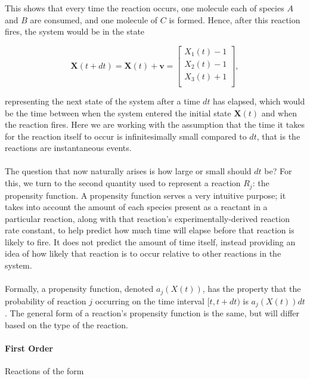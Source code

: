 \documentclass[ugrad,lot,lof,openright,11pt,oneside,onehalfspace]{RUthesis}
\begin{document}
				\noindent
				This shows that every time the reaction occurs, one molecule each of species $A$ and $B$ are consumed, and one molecule of $C$ is formed. Hence, after this reaction fires, the system would be in the state

				\begin{equation*}
				\mathbf{X}(t+dt) = \mathbf{X}(t) + \mathbf{v} = 
				\left[
					\begin{array}{c}
					X_1(t) - 1\\
					X_2(t) - 1\\
					X_3(t) + 1\\
					\end{array}
				\right],
				\end{equation*}

				\noindent
				representing the next state of the system after a time $dt$ has elapsed, which would be the time between when the system entered the initial state $\mathbf{X}(t)$ and when the reaction fires. Here we are working with the assumption that the time it takes for the reaction itself to occur is infinitesimally small compared to $dt$, that is the reactions are instantaneous events.\\
				\\
				The question that now naturally arises is how large or small should $dt$ be? For this, we turn to the second quantity used to represent a reaction $R_j$: the propensity function. A propensity function serves a very intuitive purpose; it takes into account the amount of each species present as a reactant in a particular reaction, along with that reaction's experimentally-derived reaction rate constant, to help predict how much time will elapse before that reaction is likely to fire. It does not predict the amount of time itself, instead providing an idea of how likely that reaction is to occur relative to other reactions in the system.\\
				\\
				Formally, a propensity function, denoted $a_j(X(t))$, has the property that the probability of reaction $j$ occurring on the time interval $[t,t+dt)$ is $a_j(X(t))dt$. The general form of a reaction's propensity function is the same, but will differ based on the type of the reaction.

				\paragraph{First Order} Reactions of the form
\end{document}

